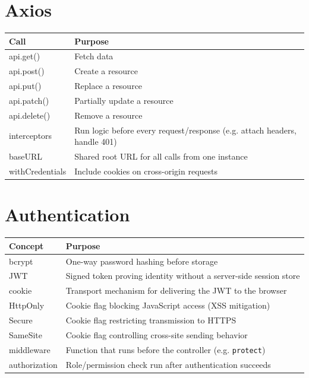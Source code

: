 \section{Axios}

\begin{tabularx}{\textwidth}{@{}>{\ttfamily}p{4cm}X@{}}
\toprule
Call & Purpose \\
\midrule
api.get() & Fetch data \\
api.post() & Create a resource \\
api.put() & Replace a resource \\
api.patch() & Partially update a resource \\
api.delete() & Remove a resource \\
interceptors & Run logic before every request/response (e.g. attach
headers, handle 401) \\
baseURL & Shared root URL for all calls from one instance \\
withCredentials & Include cookies on cross-origin requests \\
\bottomrule
\end{tabularx}

\section{Authentication}

\begin{tabularx}{\textwidth}{@{}>{\ttfamily}p{4cm}X@{}}
\toprule
Concept & Purpose \\
\midrule
bcrypt & One-way password hashing before storage \\
JWT & Signed token proving identity without a server-side session store \\
cookie & Transport mechanism for delivering the JWT to the browser \\
HttpOnly & Cookie flag blocking JavaScript access (XSS mitigation) \\
Secure & Cookie flag restricting transmission to HTTPS \\
SameSite & Cookie flag controlling cross-site sending behavior \\
middleware & Function that runs before the controller (e.g. \texttt{protect}) \\
authorization & Role/permission check run after authentication succeeds \\
\bottomrule
\end{tabularx}
